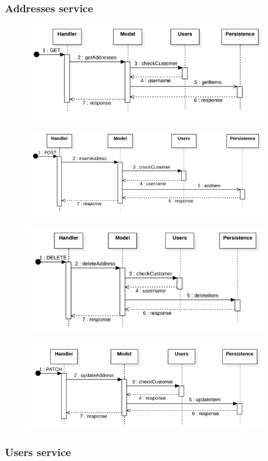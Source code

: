 \subsubsection{Addresses service}

\begin{figure}[H]
    \includegraphics[width=0.9\textwidth]{res/images/sequence-diagrams/addresses/getAddresses.png}
\end{figure}

\begin{figure}[H]
    \includegraphics[width=0.9\textwidth]{res/images/sequence-diagrams/addresses/insertAddress.png}
\end{figure}

\begin{figure}[H]
    \includegraphics[width=0.9\textwidth]{res/images/sequence-diagrams/addresses/removeAddress.png}
\end{figure}

\begin{figure}[H]
    \includegraphics[width=0.9\textwidth]{res/images/sequence-diagrams/addresses/updateAddress.png}
\end{figure}



\subsubsection{Users service}

